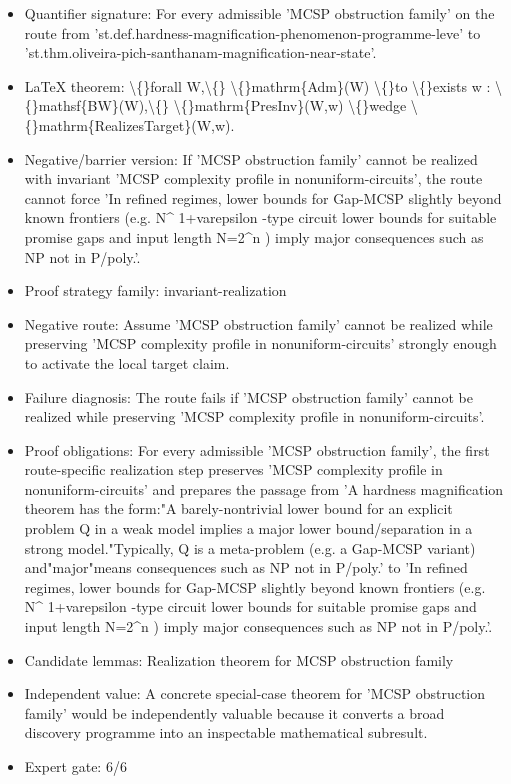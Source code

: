 \documentclass[11pt]{article}
\begin{document}
\begin{itemize}
\item Quantifier signature: For every admissible 'MCSP obstruction family' on the route from 'st.def.hardness-magnification-phenomenon-programme-leve' to 'st.thm.oliveira-pich-santhanam-magnification-near-state'.
\item LaTeX theorem: \textbackslash\{\}forall W,\textbackslash\{\} \textbackslash\{\}mathrm\{Adm\}(W) \textbackslash\{\}to \textbackslash\{\}exists w : \textbackslash\{\}mathsf\{BW\}(W),\textbackslash\{\} \textbackslash\{\}mathrm\{PresInv\}(W,w) \textbackslash\{\}wedge \textbackslash\{\}mathrm\{RealizesTarget\}(W,w).
\item Negative/barrier version: If 'MCSP obstruction family' cannot be realized with invariant 'MCSP complexity profile in nonuniform-circuits', the route cannot force 'In refined regimes, lower bounds for Gap-MCSP slightly beyond known frontiers (e.g. N\textasciicircum{} 1+varepsilon -type circuit lower bounds for suitable promise gaps and input length N=2\textasciicircum{}n ) imply major consequences such as NP not in P/poly.'.
\item Proof strategy family: invariant-realization
\item Negative route: Assume 'MCSP obstruction family' cannot be realized while preserving 'MCSP complexity profile in nonuniform-circuits' strongly enough to activate the local target claim.
\item Failure diagnosis: The route fails if 'MCSP obstruction family' cannot be realized while preserving 'MCSP complexity profile in nonuniform-circuits'.
\item Proof obligations: For every admissible 'MCSP obstruction family', the first route-specific realization step preserves 'MCSP complexity profile in nonuniform-circuits' and prepares the passage from 'A hardness magnification theorem has the form:"A barely-nontrivial lower bound for an explicit problem Q in a weak model implies a major lower bound/separation in a strong model."Typically, Q is a meta-problem (e.g. a Gap-MCSP variant) and"major"means consequences such as NP not in P/poly.' to 'In refined regimes, lower bounds for Gap-MCSP slightly beyond known frontiers (e.g. N\textasciicircum{} 1+varepsilon -type circuit lower bounds for suitable promise gaps and input length N=2\textasciicircum{}n ) imply major consequences such as NP not in P/poly.'.
\item Candidate lemmas: Realization theorem for MCSP obstruction family
\item Independent value: A concrete special-case theorem for 'MCSP obstruction family' would be independently valuable because it converts a broad discovery programme into an inspectable mathematical subresult.
\item Expert gate: 6/6
\end{itemize}
\end{document}
